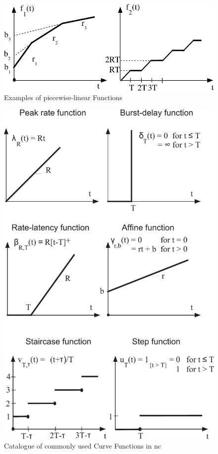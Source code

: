 \begin{figure}[H]
  \centering
  \includegraphics*[width=\textwidth,height=\textheight,keepaspectratio]{Figures/nc_basics_comp}
  \caption{Examples of piecewise-linear Functions~\cite{thiran_network_2001}}
  \label{fig:compound_curve}
\end{figure}

\begin{figure}[H]
  \centering
  \includegraphics*[width=\textwidth,height=\textheight,keepaspectratio]{Figures/nc_functions}
  \caption{Catalogue of commonly used Curve Functions in \gls{nc}~\cite{thiran_network_2001}}
  \label{fig:nc_functions}
\end{figure}
\noindent
